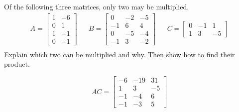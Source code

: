 
\begin{exerciseStatement}


Of the following three matrices, only two may be multiplied. 
\begin{align*} A= \left[\begin{array}{cc}
1 & -6 \\
0 & 1 \\
1 & -1 \\
0 & -1
\end{array}\right]  & & B= \left[\begin{array}{ccc}
0 & -2 & -5 \\
-1 & 6 & 4 \\
0 & -5 & -4 \\
-1 & 3 & -2
\end{array}\right]  & & C= \left[\begin{array}{ccc}
0 & -1 & 1 \\
1 & 3 & -5
\end{array}\right]  \\ \end{align*}
             Explain which two can be multiplied and why. Then show how to find their product.


\end{exerciseStatement}
    
\begin{exerciseAnswer} 
\[AC= \left[\begin{array}{ccc}
-6 & -19 & 31 \\
1 & 3 & -5 \\
-1 & -4 & 6 \\
-1 & -3 & 5
\end{array}\right] \]
\end{exerciseAnswer}
    

